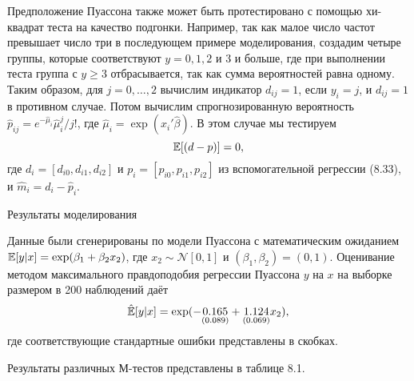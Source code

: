 Предположение Пуассона также может быть протестировано с помощью хи-квадрат теста на качество подгонки. Например, так как малое число частот превышает число три в последующем примере моделирования, создадим четыре группы, которые соответствуют $y = 0, 1, 2$ и $3$ и больше, где при выполнении теста группа с $y \geq 3$ отбрасывается, так как сумма вероятностей равна одному. Таким образом, для $j = 0, \dots, 2$ вычислим индикатор $d_{ij} = 1$, если $y_i = j$, и $d_{ij} = 1$ в противном случае. Потом вычислим спрогнозированную вероятность $\hat{p}_{ij} = e^{-\hat{\mu}_i}\hat{\mu}_i^j/j!$, где $\hat{\mu}_i = \exp(x_i'\hat{\beta})$. В этом случае мы тестируем
\[
\mathbb{E}[(d - p)] = 0,
\]
где $d_i = [d_{i0}, d_{i1}, d_{i2}]$ и $p_i = [p_{i0}, p_{i1}, p_{i2}]$ из вспомогательной регрессии (8.33), и $\hat{m}_i = d_i - \hat{p}_i$. 

\begin{center}
Результаты моделирования
\end{center}

Данные были сгенерированы по модели Пуассона с математическим ожиданием $\mathbb{E}[y|x] = \exp(\beta_1 + \beta_2x_2)$, где $x_2 \sim \mathcal{N}[0,1]$ и $(\beta_1, \beta_2) = (0,1)$. Оценивание методом максимального правдоподобия регрессии Пуассона $y$ на $x$ на выборке размером в 200 наблюдений даёт
\[
\hat{\mathbb{E}}[y|x] = \exp(-\underset{(0.089)}{0.165} + \underset{(0.069)}{1.124}x_2),
\]
где соответствующие стандартные ошибки представлены в скобках.

Результаты различных М-тестов представлены в таблице 8.1.

